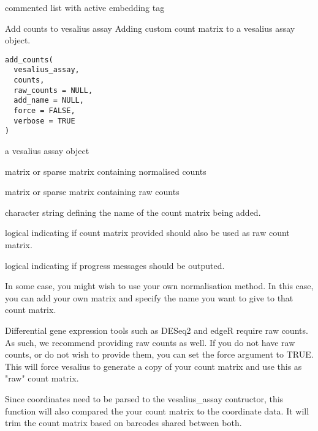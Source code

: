 \documentclass[a4paper]{book}
\begin{document}
%
\begin{Value}
commented list with active embedding tag
\end{Value}
%
\begin{Description}
Add counts to vesalius assay
Adding custom count matrix to a vesalius assay object.
\end{Description}
%
\begin{Usage}
\begin{verbatim}
add_counts(
  vesalius_assay,
  counts,
  raw_counts = NULL,
  add_name = NULL,
  force = FALSE,
  verbose = TRUE
)
\end{verbatim}
\end{Usage}
%
\begin{Arguments}
\begin{ldescription}
\item[\code{vesalius\_assay}] a vesalius assay object

\item[\code{counts}] matrix or sparse matrix containing normalised counts

\item[\code{raw\_counts}] matrix or sparse matrix containing raw counts

\item[\code{add\_name}] character string defining the name of the count matrix
being added.

\item[\code{force}] logical indicating if count matrix provided should also be used
as raw count matrix.

\item[\code{verbose}] logical indicating if progress messages should be outputed.
\end{ldescription}
\end{Arguments}
%
\begin{Details}
In some case, you might wish to use your own normalisation method.
In this case, you can add your own matrix and specify the name you want to 
give to that count matrix. 

Differential gene expression tools
such as DESeq2 and edgeR require raw counts. As such, we recommend providing
raw counts as well. If you do not have raw counts, or do not wish to provide
them, you can set the force argument to TRUE. This will force vesalius to
generate a copy of your count matrix and use this as "raw" count matrix.

Since coordinates need to be parsed to the vesalius\_assay contructor,
this function will also compared the your count matrix to the 
coordinate data. It will trim the count matrix based on barcodes shared
between both.
\end{Details}
\end{document}
